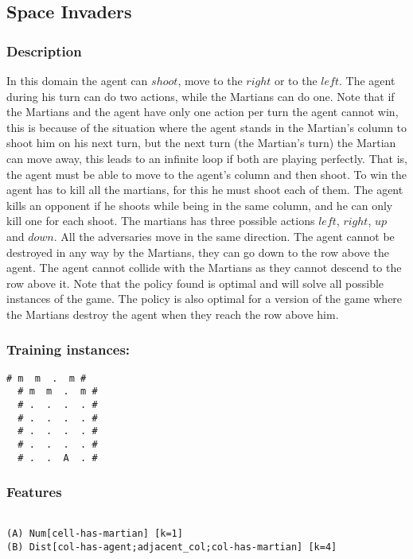 \documentclass[a4paper]{article}
\begin{document}
\subsection{Space Invaders}
\subsubsection{Description}
In this domain the agent can $shoot$, move to the $right$ or to the $left$. The agent during his turn can do two actions, while the Martians can do one. Note that if the Martians and the agent have only one action per turn the agent cannot win, this is because of the situation where the agent stands in the Martian's column to shoot him on his next turn, but the next turn (the Martian's turn) the Martian can move away, this leads to an infinite loop if both are playing perfectly. That is, the agent must be able to move to the agent's column and then shoot. To win the agent has to kill all the martians, for this he must shoot each of them. The agent kills an opponent if he shoots while being in the same column, and he can only kill one for each shoot. The martians has three possible actions $left$, $right$, $up$ and $down$. All the adversaries move in the same direction. The agent cannot be destroyed in any way by the Martians, they can go down to the row above the agent. The agent cannot collide with the Martians as they cannot descend to the row above it. Note that the policy found is optimal and will solve all possible instances of the game. The policy is also optimal for a version of the game where the Martians destroy the agent when they reach the row above him.

\subsubsection{Training instances:}
\begin{Verbatim}[fontsize=\footnotesize]
  # m  m  .  m #
  # m  m  .  m #
  # .  .  .  . #
  # .  .  .  . #
  # .  .  .  . #
  # .  .  .  . #
  # .  .  A  . #
\end{Verbatim}

\subsubsection{Features}
\begin{Verbatim}[fontsize=\footnotesize]

(A) Num[cell-has-martian] [k=1]
(B) Dist[col-has-agent;adjacent_col;col-has-martian] [k=4]
\end{Verbatim}
\end{document}
